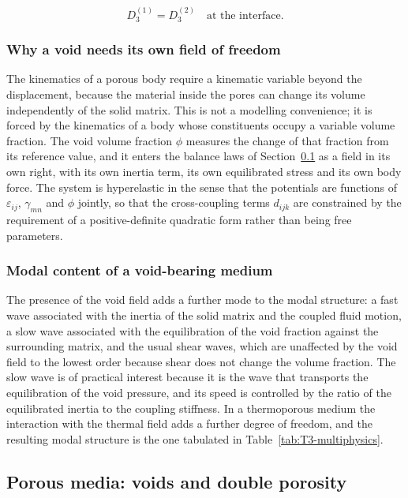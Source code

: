 \begin{equation}
D_3^{(1)} = D_3^{(2)} \quad \text{at the interface}.
\label{eq:5.13}
\end{equation}

\subsubsection{Why a void needs its own field of freedom}

The kinematics of a porous body require a kinematic variable beyond the displacement, because the material inside the pores can change its volume independently of the solid matrix. This is not a modelling convenience; it is forced by the kinematics of a body whose constituents occupy a variable volume fraction. The void volume fraction $\phi$ measures the change of that fraction from its reference value, and it enters the balance laws of Section~\ref{sec:5.4} as a field in its own right, with its own inertia term, its own equilibrated stress and its own body force. The system is hyperelastic in the sense that the potentials are functions of $\varepsilon_{ij}$, $\gamma_{mn}$ and $\phi$ jointly, so that the cross-coupling terms $d_{ijk}$ are constrained by the requirement of a positive-definite quadratic form rather than being free parameters.

\subsubsection{Modal content of a void-bearing medium}

The presence of the void field adds a further mode to the modal structure: a fast wave associated with the inertia of the solid matrix and the coupled fluid motion, a slow wave associated with the equilibration of the void fraction against the surrounding matrix, and the usual shear waves, which are unaffected by the void field to the lowest order because shear does not change the volume fraction. The slow wave is of practical interest because it is the wave that transports the equilibration of the void pressure, and its speed is controlled by the ratio of the equilibrated inertia to the coupling stiffness. In a thermoporous medium the interaction with the thermal field adds a further degree of freedom, and the resulting modal structure is the one tabulated in Table~\ref{tab:T3-multiphysics}.

\subsection{Porous media: voids and double porosity}
\label{sec:5.4}


